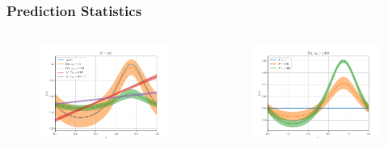 \documentclass[aspectratio=169]{beamer}
\begin{document}
\begin{frame}
\frametitle{Prediction Statistics}

\begin{columns}[c]

\begin{column}{.5\linewidth}

\begin{figure}
	\centering
	\includegraphics[width=1\linewidth]{Discrete/SE/predict_a0.png}
	\label{fig:Discrete/SE/predict_a0}
\end{figure}

\end{column}

\begin{column}{.5\linewidth}

\begin{figure}
	\centering
	\includegraphics[width=1\linewidth]{Discrete/SE/predict_N.png}
	\label{fig:Discrete/SE/predict_N}
\end{figure}


\end{column}
\end{columns}
\end{frame}
\end{document}

